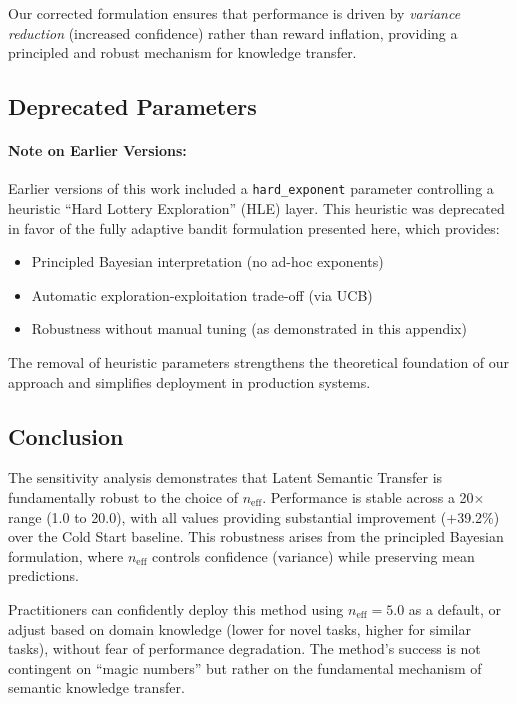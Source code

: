 Our corrected formulation ensures that performance is driven by \emph{variance reduction} 
(increased confidence) rather than reward inflation, providing a principled and robust 
mechanism for knowledge transfer.

\subsection{Deprecated Parameters}

\paragraph{Note on Earlier Versions:} Earlier versions of this work included a 
\texttt{hard\_exponent} parameter controlling a heuristic ``Hard Lottery Exploration'' 
(HLE) layer. This heuristic was deprecated in favor of the fully adaptive bandit 
formulation presented here, which provides:
\begin{itemize}[leftmargin=*,noitemsep]
    \item Principled Bayesian interpretation (no ad-hoc exponents)
    \item Automatic exploration-exploitation trade-off (via UCB)
    \item Robustness without manual tuning (as demonstrated in this appendix)
\end{itemize}

The removal of heuristic parameters strengthens the theoretical foundation of our 
approach and simplifies deployment in production systems.

\subsection{Conclusion}

The sensitivity analysis demonstrates that Latent Semantic Transfer is fundamentally 
robust to the choice of $n_{\text{eff}}$. Performance is stable across a 20$\times$ 
range (1.0 to 20.0), with all values providing substantial improvement (+39.2\%) 
over the Cold Start baseline. This robustness arises from the principled Bayesian 
formulation, where $n_{\text{eff}}$ controls confidence (variance) while preserving 
mean predictions.

Practitioners can confidently deploy this method using $n_{\text{eff}}=5.0$ as a 
default, or adjust based on domain knowledge (lower for novel tasks, higher for 
similar tasks), without fear of performance degradation. The method's success is 
not contingent on ``magic numbers'' but rather on the fundamental mechanism of 
semantic knowledge transfer.

